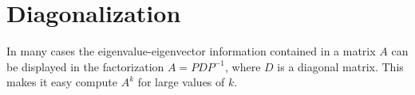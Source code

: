 \documentclass[12pt letter]{report}
\begin{document}


\chapter{Diagonalization}

In many cases the eigenvalue-eigenvector information contained in a matrix $A$ can be displayed in the factorization $A
  = PDP^{-1}$, where $D$ is a diagonal matrix. This makes it easy compute $A^{k}$ for large values of $k$.
\end{document}
